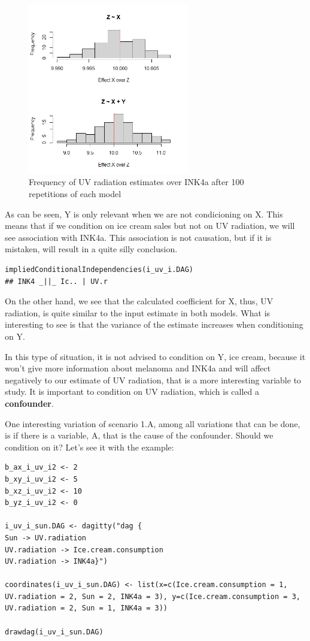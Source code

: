 \documentclass{article}
\begin{document}
\begin{figure}[h]
\caption{Frequency of UV radiation estimates over INK4a after 100 repetitions of each model}
\includegraphics[width=7cm]{i_uv_i1.png}
\centering
\end{figure}

As can be seen, Y is only relevant when we are not condicioning on X. This means that if we condition on ice cream sales but not on UV radiation, we will see association with INK4a. This association is not causation, but if it is mistaken, will result in a quite silly conclusion.

\begin{lstlisting}
impliedConditionalIndependencies(i_uv_i.DAG)
## INK4 _||_ Ic.. | UV.r
\end{lstlisting}

On the other hand, we see that the calculated coefficient for X, thus, UV radiation, is quite similar to the input estimate in both models. What is interesting to see is that the variance of the estimate increases when conditioning on Y.\par
In this type of situation, it is not advised to condition on Y, ice cream, because it won't give more information about melanoma and INK4a and will affect negatively to our estimate of UV radiation, that is a more interesting variable to study. It is important to condition on UV radiation, which is called a \textbf{confounder}.\par

One interesting variation of scenario 1.A, among all variations that can be done, is if there is a variable, A, that is the cause of the confounder. Should we condition on it? Let's see it with the example:\par
\begin{lstlisting}
b_ax_i_uv_i2 <- 2
b_xy_i_uv_i2 <- 5
b_xz_i_uv_i2 <- 10
b_yz_i_uv_i2 <- 0

i_uv_i_sun.DAG <- dagitty("dag {
Sun -> UV.radiation
UV.radiation -> Ice.cream.consumption
UV.radiation -> INK4a}")

coordinates(i_uv_i_sun.DAG) <- list(x=c(Ice.cream.consumption = 1, UV.radiation = 2, Sun = 2, INK4a = 3), y=c(Ice.cream.consumption = 3, UV.radiation = 2, Sun = 1, INK4a = 3))

drawdag(i_uv_i_sun.DAG)
\end{lstlisting}
\end{document}
